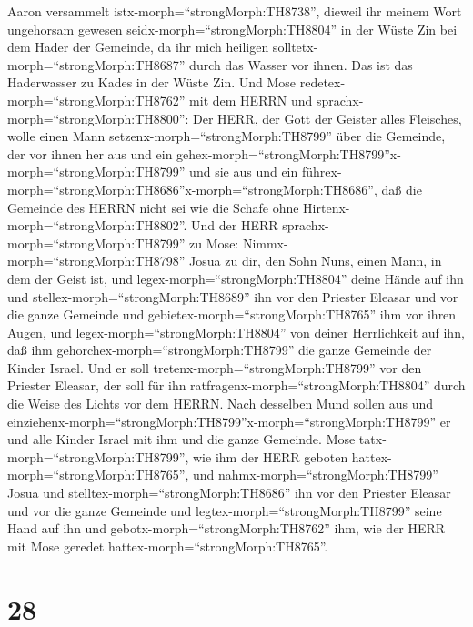 Aaron versammelt istx-morph=``strongMorph:TH8738'', 
dieweil ihr meinem Wort ungehorsam gewesen
seidx-morph=``strongMorph:TH8804'' in der Wüste Zin bei dem Hader der
Gemeinde, da ihr mich heiligen solltetx-morph=``strongMorph:TH8687''
durch das Wasser vor ihnen. Das ist das Haderwasser zu Kades in der
Wüste Zin.  Und Mose redetex-morph=``strongMorph:TH8762''
mit dem HERRN und sprachx-morph=``strongMorph:TH8800'': 
Der HERR, der Gott der Geister alles Fleisches, wolle einen Mann
setzenx-morph=``strongMorph:TH8799'' über die Gemeinde, 
der vor ihnen her aus und ein
gehex-morph=``strongMorph:TH8799''x-morph=``strongMorph:TH8799'' und sie
aus und ein
führex-morph=``strongMorph:TH8686''x-morph=``strongMorph:TH8686'', daß
die Gemeinde des HERRN nicht sei wie die Schafe ohne
Hirtenx-morph=``strongMorph:TH8802''.  Und der HERR
sprachx-morph=``strongMorph:TH8799'' zu Mose:
Nimmx-morph=``strongMorph:TH8798'' Josua zu dir, den Sohn Nuns, einen
Mann, in dem der Geist ist, und legex-morph=``strongMorph:TH8804'' deine
Hände auf ihn  und stellex-morph=``strongMorph:TH8689'' ihn
vor den Priester Eleasar und vor die ganze Gemeinde und
gebietex-morph=``strongMorph:TH8765'' ihm vor ihren Augen, 
und legex-morph=``strongMorph:TH8804'' von deiner Herrlichkeit auf ihn,
daß ihm gehorchex-morph=``strongMorph:TH8799'' die ganze Gemeinde der
Kinder Israel.  Und er soll
tretenx-morph=``strongMorph:TH8799'' vor den Priester Eleasar, der soll
für ihn ratfragenx-morph=``strongMorph:TH8804'' durch die Weise des
Lichts vor dem HERRN. Nach desselben Mund sollen aus und
einziehenx-morph=``strongMorph:TH8799''x-morph=``strongMorph:TH8799'' er
und alle Kinder Israel mit ihm und die ganze Gemeinde. 
Mose tatx-morph=``strongMorph:TH8799'', wie ihm der HERR geboten
hattex-morph=``strongMorph:TH8765'', und
nahmx-morph=``strongMorph:TH8799'' Josua und
stelltex-morph=``strongMorph:TH8686'' ihn vor den Priester Eleasar und
vor die ganze Gemeinde  und
legtex-morph=``strongMorph:TH8799'' seine Hand auf ihn und
gebotx-morph=``strongMorph:TH8762'' ihm, wie der HERR mit Mose geredet
hattex-morph=``strongMorph:TH8765''.

\hypertarget{section-27}{%
\section{28}\label{section-27}}

